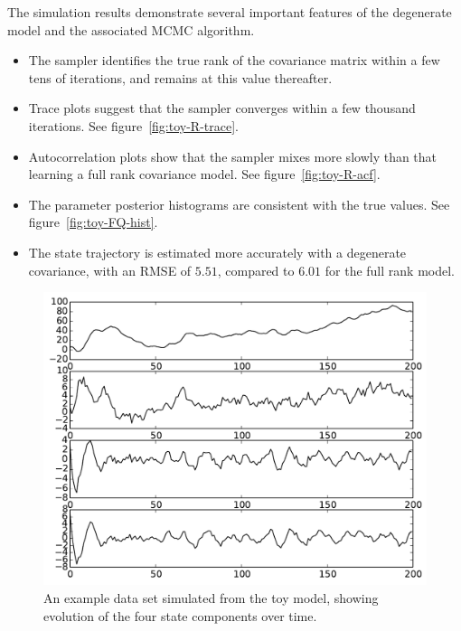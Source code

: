 \documentclass[journal,10pt]{IEEEtran}
\begin{document}
The simulation results demonstrate several important features of the degenerate model and the associated MCMC algorithm.
\begin{itemize}
 \item The sampler identifies the true rank of the covariance matrix within a few tens of iterations, and remains at this value thereafter.
 \item Trace plots suggest that the sampler converges within a few thousand iterations. See figure~\ref{fig:toy-R-trace}.
 \item Autocorrelation plots show that the sampler mixes more slowly than that learning a full rank covariance model. See figure~\ref{fig:toy-R-acf}.
 \item The parameter posterior histograms are consistent with the true values. See figure~\ref{fig:toy-FQ-hist}.
 \item The state trajectory is estimated more accurately with a degenerate covariance, with an RMSE of $5.51$, compared to $6.01$ for the full rank model.
\end{itemize}

\begin{figure}
 \centering
 \includegraphics[width=0.9\columnwidth]{figures/toy-state.pdf}
 \caption{An example data set simulated from the toy model, showing evolution of the four state components over time.}
 \label{fig:toy-data}
\end{figure}
\end{document}
